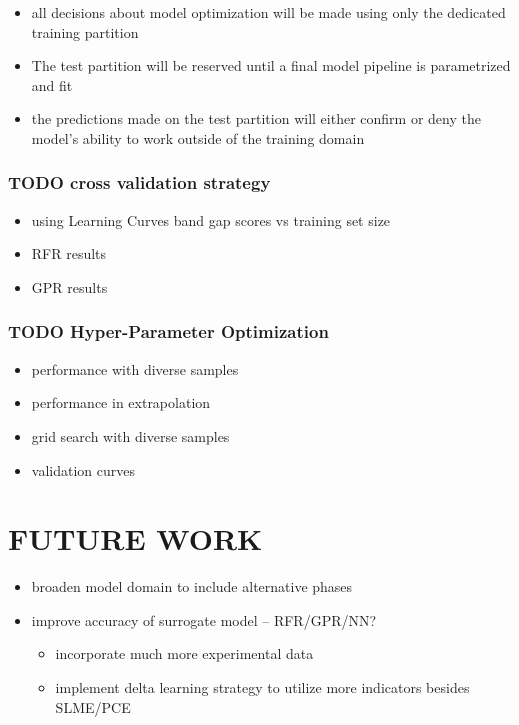 \documentclass[aip, jmp, amsmath, amssymb]{revtex4-2}
\begin{document}
\begin{itemize}
\item all decisions about model optimization will be made using only the
dedicated training partition
\item The test partition will be reserved until a final model pipeline is
parametrized and fit
\item the predictions made on the test partition will either confirm or
deny the model's ability to work outside of the training domain
\end{itemize}

\subsubsection*{{\bfseries\sffamily TODO} cross validation strategy}
\label{sec:org3c806fd}
\begin{itemize}
\item using Learning Curves
\label{sec:orgb7ddf6a}
band gap scores vs training set size
\item RFR results
\label{sec:org1a1439f}
\item GPR results
\label{sec:orgcda13ec}
\end{itemize}
\subsubsection*{{\bfseries\sffamily TODO} Hyper-Parameter Optimization}
\label{sec:orga986a85}
\begin{itemize}
\item performance with diverse samples
\label{sec:org1bb73ca}
\item performance in extrapolation
\label{sec:orga1d7075}
\item grid search with diverse samples
\label{sec:orge4893d7}
\item validation curves
\label{sec:org65e979d}
\end{itemize}
\section*{FUTURE WORK}
\label{sec:org2415fe9}
\begin{itemize}
\item broaden model domain to include alternative phases

\item improve accuracy of surrogate model -- RFR/GPR/NN?
\begin{itemize}
\item incorporate much more experimental data
\cite{jacobsson-2021-open-acces,briones-2021-accel-lattic}
\item implement delta learning strategy to utilize more indicators
besides SLME/PCE
\end{itemize}
\end{itemize}
\end{document}
